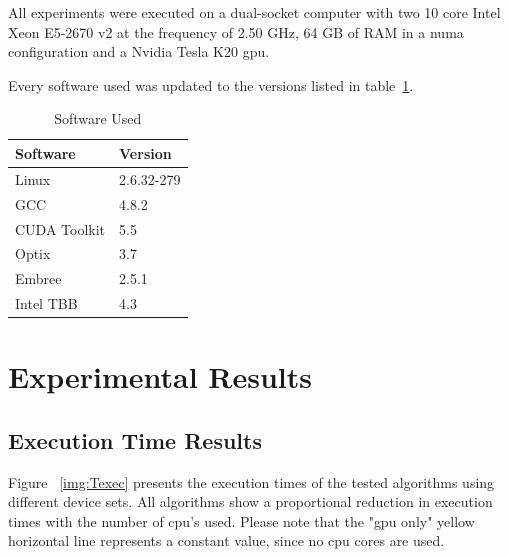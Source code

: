 
All experiments were executed on a dual-socket computer with two 10 core Intel Xeon E5-2670 v2 at the frequency of 2.50 GHz, 64 GB of RAM in a \gls{numa} configuration and a Nvidia Tesla K20 \gls{gpu}.

Every software used was updated to the versions listed in table~\ref{tab:soft_ver}.

\begin{table}[h]
\centering
\begin{tabular}{|l|l|}

\hline
Software & Version \\
\hline
Linux & 2.6.32-279 \\
\hline
GCC & 4.8.2 \\
\hline
CUDA Toolkit & 5.5 \\
\hline
Optix & 3.7 \\
\hline
Embree & 2.5.1 \\
\hline
Intel TBB & 4.3 \\
\hline
\end{tabular}
\caption{\label{tab:soft_ver} Software Used}
\end{table}

\section{Experimental Results}

\subsection{\label{subsec:texec}Execution Time Results}

Figure ~\ref{img:Texec} presents the execution times of the tested algorithms using different device sets. All algorithms show a proportional reduction in execution times with the number of \gls{cpu}'s used. Please note that the "\gls{gpu} only" yellow horizontal line represents a constant value, since no \gls{cpu} cores are used.

